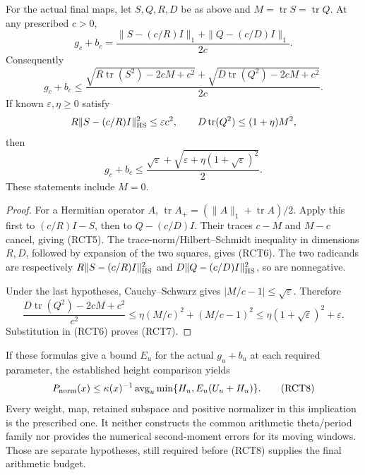 \begin{theorem}
\label{thm:retained-trace-fixed-moment}
For the actual final maps, let \(S,Q,R,D\) be as above and
\(M=\operatorname{tr}S=\operatorname{tr}Q\). At any
prescribed \(c>0\),
\[
 g_c+b_c=
 \frac{\|S-(c/R)I\|_1+\|Q-(c/D)I\|_1}{2c}.
 \tag{RCT5}
\]
Consequently
\[
 g_c+b_c\le
 \frac{\sqrt{R\operatorname{tr}(S^2)-2cM+c^2}
       +\sqrt{D\operatorname{tr}(Q^2)-2cM+c^2}}{2c}.
 \tag{RCT6}
\]
If known \(\varepsilon,\eta\ge0\) satisfy
\[
 R\|S-(c/R)I\|_{\rm HS}^2\le\varepsilon c^2,\qquad
 D\operatorname{tr}(Q^2)\le(1+\eta)M^2,
\]
then
\[
 g_c+b_c\le
 \frac{\sqrt{\varepsilon}
       +\sqrt{\varepsilon+\eta(1+\sqrt{\varepsilon})^2}}2.
 \tag{RCT7}
\]
These statements include \(M=0\).
\end{theorem}
\begin{proof}
For a Hermitian operator \(A\),
\(\operatorname{tr}A_+=(\|A\|_1+\operatorname{tr}A)/2\).
Apply this first to \((c/R)I-S\), then to \(Q-(c/D)I\).
Their traces \(c-M\) and \(M-c\) cancel, giving (RCT5).
The trace-norm/Hilbert--Schmidt inequality in dimensions
\(R,D\), followed by expansion of the two squares, gives
(RCT6). The two radicands are respectively
\(R\|S-(c/R)I\|_{\rm HS}^2\) and
\(D\|Q-(c/D)I\|_{\rm HS}^2\), so are nonnegative.

Under the last hypotheses, Cauchy--Schwarz gives
\(|M/c-1|\le\sqrt{\varepsilon}\). Therefore
\[
 \frac{D\operatorname{tr}(Q^2)-2cM+c^2}{c^2}
 \le\eta(M/c)^2+(M/c-1)^2
 \le\eta(1+\sqrt{\varepsilon})^2+\varepsilon.
\]
Substitution in (RCT6) proves (RCT7).
\end{proof}

If these formulas give a bound \(E_u\) for the actual
\(g_u+b_u\) at each required parameter, the established
height comparison yields
\[
 P_{\rm norm}(x)\le\kappa(x)^{-1}\operatorname{avg}_u
                  \min\{H_u,E_u(U_u+H_u)\}.
 \tag{RCT8}
\]
Every weight, map, retained subspace and positive normalizer
in this implication is the prescribed one. It neither
constructs the common arithmetic theta/period family nor
provides the numerical second-moment errors for its moving
windows. Those are separate hypotheses, still required
before (RCT8) supplies the final arithmetic budget.
